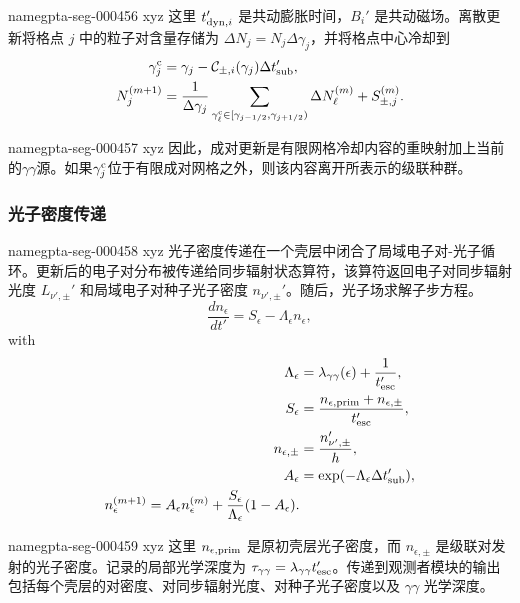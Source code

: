 \documentclass[twocolumn]{aastex702}
\makeatletter
\providecommand{\gptareaderanchor}[1]{\pdfdest name{#1} xyz}%
\providecommand{\gptareaderanchor}[1]{\special{pdf:dest (#1) [ @thispage /XYZ @xpos @ypos null ]}}%
\makeatother
\begin{document}
\gptareaderanchor{gpta-seg-000456}%
这里 \(t'_{{\rm dyn},i}\) 是共动膨胀时间，\(B_i'\) 是共动磁场。离散更新将格点 \(j\) 中的粒子对含量存储为 \(\Delta N_j=N_j\Delta\gamma_j\)，并将格点中心冷却到
\begin{equation}
\begin{aligned}
\gamma_j^{\rm c}
&=\gamma_j-\mathcal{C}_{\pm,i}(\gamma_j)\Delta t'_{\rm sub},\\
N_j^{(m+1)}
&=
\frac{1}{\Delta\gamma_j}
\sum_{\gamma_\ell^{\rm c}\in[\gamma_{j-1/2},\gamma_{j+1/2})}
\Delta N_\ell^{(m)}
+S_{\pm,j}^{(m)} .
\end{aligned}
\end{equation}

\gptareaderanchor{gpta-seg-000457}%
因此，成对更新是有限网格冷却内容的重映射加上当前的\(\gamma\gamma\)源。如果\(\gamma_j^{\rm c}\)位于有限成对网格之外，则该内容离开所表示的级联种群。

\subsubsection{光子密度传递}


\gptareaderanchor{gpta-seg-000458}%
光子密度传递在一个壳层中闭合了局域电子对-光子循环。更新后的电子对分布被传递给同步辐射状态算符，该算符返回电子对同步辐射光度 \(L_{\nu',\pm}'\) 和局域电子对种子光子密度 \(n_{\nu',\pm}'\)。随后，光子场求解子步方程。
\begin{equation}
\frac{dn_\epsilon}{dt'}=
S_\epsilon-\Lambda_\epsilon n_\epsilon,
\end{equation}
with
\begin{equation}
\begin{aligned}
\Lambda_\epsilon&=\lambda_{\gamma\gamma}(\epsilon)+\frac{1}{t'_{\rm esc}},\\
S_\epsilon&=\frac{n_{\epsilon,{\rm prim}}+n_{\epsilon,\pm}}{t'_{\rm esc}},\\
n_{\epsilon,\pm}&=\frac{n_{\nu',\pm}'}{h},\\
A_\epsilon&=\exp(-\Lambda_\epsilon\Delta t'_{\rm sub}),\\
n_\epsilon^{(m+1)}=
A_\epsilon n_\epsilon^{(m)}
+\frac{S_\epsilon}{\Lambda_\epsilon}(1-A_\epsilon).
\end{aligned}
\end{equation}

\gptareaderanchor{gpta-seg-000459}%
这里 \(n_{\epsilon,{\rm prim}}\) 是原初壳层光子密度，而 \(n_{\epsilon,\pm}\) 是级联对发射的光子密度。记录的局部光学深度为 \(\tau_{\gamma\gamma}=\lambda_{\gamma\gamma}t'_{\rm esc}\)。传递到观测者模块的输出包括每个壳层的对密度、对同步辐射光度、对种子光子密度以及 \(\gamma\gamma\) 光学深度。
\end{document}
